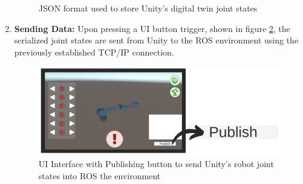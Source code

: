 \begin{enumerate}
\begin{figure}[htbp]
            \caption{JSON format used to store Unity's digital twin joint states}
            \label{fig:json_pub}
            \end{figure}
        \item \textbf{Sending Data:} Upon pressing a UI button trigger, shown in figure \ref{fig:publish_UI_button}, the serialized joint states are sent from Unity to the ROS environment using the previously established TCP/IP connection.
            \begin{figure}[htpb]
                \centering
                \includegraphics[width=0.8\linewidth]{figs/UI_Publish_button.png}
                \caption{UI Interface with Publishing button to send Unity's robot joint states into ROS the environment}
                \label{fig:publish_UI_button}
            \end{figure}
    \end{enumerate}


